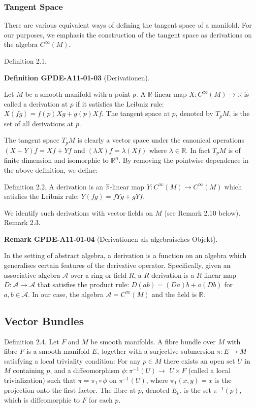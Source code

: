 \documentclass[10pt, letterpaper]{article}
\newcommand{\CustomHeading}[3]{%
  \par\medskip\noindent%
  \textbf{#1 #2} \textnormal{(#3)}.\enskip%
}
\newenvironment{DEF}[2]{\begin{unitbox}\CustomHeading{Definition}{#1}{#2}}{\end{unitbox}}
\newenvironment{REM}[2]{\begin{unitbox}\CustomHeading{Remark}{#1}{#2}}{\end{unitbox}}
\begin{document}
\subsubsection*{Tangent Space}

There are various equivalent ways of defining the tangent space of a manifold. For our purposes, we emphasis the construction of the tangent space as derivations on the algebra $C^{\infty}(M)$.

Definition 2.1. 

\begin{DEF}{GPDE-A11-01-03}{Derivationen}
Let $M$ be a smooth manifold with a point $p$. A $\mathbb{R}$-linear map $X: C^{\infty}(M) \rightarrow \mathbb{R}$ is called a derivation at $p$ if it satisfies the Leibniz rule: $X(f g)=f(p) X g+g(p) X f$. The tangent space at $p$, denoted by $T_{p} M$, is the set of all derivations at $p$.

The tangent space $T_{p} M$ is clearly a vector space under the canonical operations $(X+Y) f=X f+Y f$ and $(\lambda X) f=\lambda(X f)$ where $\lambda \in \mathbb{R}$. In fact $T_{p} M$ is of finite dimension and isomorphic to $\mathbb{R}^{n}$. By removing the pointwise dependence in the above definition, we define:

Definition 2.2. A derivation is an $\mathbb{R}$-linear map $Y: C^{\infty}(M) \rightarrow C^{\infty}(M)$ which satisfies the Leibniz rule: $Y(f g)=f Y g+g Y f$.
\end{DEF}

We identify such derivations with vector fields on $M$ (see Remark 2.10 below).\\

Remark 2.3. 

\begin{REM}{GPDE-A11-01-04}{Derivationen als algebraisches Objekt}
In the setting of abstract algebra, a derivation is a function on an algebra which generalises certain features of the derivative operator. Specifically, given an associative algebra $\mathscr{A}$ over a ring or field $R$, a $R$-derivation is a $R$-linear map $D: \mathscr{A} \rightarrow \mathscr{A}$ that satisfies the product rule: $D(a b)=(D a) b+a(D b)$ for $a, b \in \mathscr{A}$. In our case, the algebra $\mathscr{A}=C^{\infty}(M)$ and the field is $\mathbb{R}$.
\end{REM}




\subsection*{Vector Bundles}
Definition 2.4. Let $F$ and $M$ be smooth manifolds. A fibre bundle over $M$ with fibre $F$ is a smooth manifold $E$, together with a surjective submersion $\pi: E \rightarrow M$ satisfying a local triviality condition: For any $p \in M$ there exists an open set $U$ in $M$ containing $p$, and a diffeomorphism $\phi: \pi^{-1}(U) \rightarrow$ $U \times F$ (called a local trivialization) such that $\pi=\pi_{1} \circ \phi$ on $\pi^{-1}(U)$, where $\pi_{1}(x, y)=x$ is the projection onto the first factor. The fibre at $p$, denoted $E_{p}$, is the set $\pi^{-1}(p)$, which is diffeomorphic to $F$ for each $p$.
\end{document}
